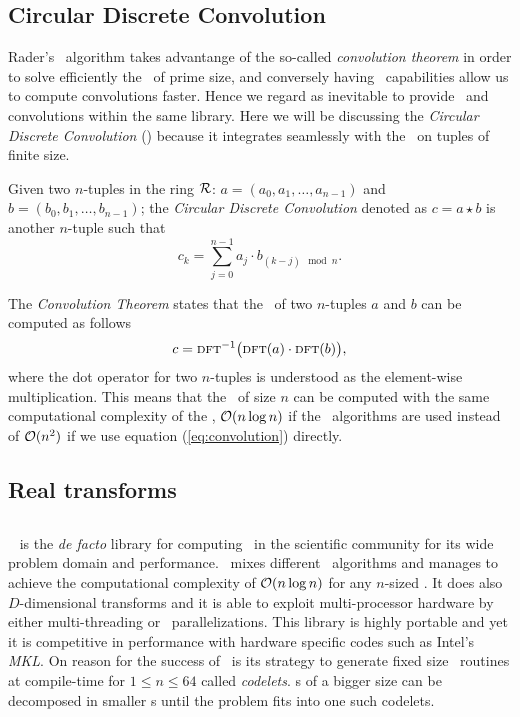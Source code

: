 \subsection{Circular Discrete Convolution}
Rader's \fft\ algorithm takes advantange of the so-called
\emph{convolution theorem} in order to solve efficiently the \dft\ of prime size, 
and conversely having \fft\ capabilities allow
us to compute convolutions faster. Hence we regard as
inevitable to provide \dft\ and convolutions within the same library.
Here we will be discussing the \emph{Circular Discrete Convolution} (\cdc)
because it integrates seamlessly with the \dft\ on tuples of finite size.
\begin{definition}
    Given two $n$-tuples in the ring $\mathcal{R}$: 
    $a = (a_0,a_1,\ldots,a_{n-1})$ and $b=(b_0,b_1,\ldots,b_{n-1})$;
    the \emph{Circular Discrete Convolution} denoted as 
    $c = a\star b$ is another
    $n$-tuple such that
    \begin{equation} 
        c_k = \sum_{j=0}^{n-1} a_j \cdot b_{(k-j) \mod n}.
        \label{eq:convolution}
    \end{equation}
    \label{def:convolution}
\end{definition}
The \emph{Convolution Theorem} states that the \cdc\ of two $n$-tuples $a$ and
$b$ can be computed as follows
\begin{equation}
    c = \textsc{dft}^{-1}\big( \textsc{dft}(a) \cdot \textsc{dft}(b)  \big),
    \label{eq:conv_theorem}
\end{equation}
where the dot operator for two $n$-tuples is understood as the element-wise
multiplication. This means that the \cdc\ of size $n$ can be computed with the
same computational complexity of the \dft, $\mathcal{O}(n\log n)$ if the \fft\
algorithms are used instead of $\mathcal{O}(n^2)$ if we use equation
(\ref{eq:convolution}) directly.

\subsection{Real transforms}

\subsection{\fftw}
\fftw\ \cite{FFTW05} is the \emph{de facto} library for computing \dft\ in the scientific
community for its wide problem domain and performance.
\fftw\ mixes different \fft\ algorithms and manages to achieve the computational
complexity of $\mathcal{O}(n \log n)$ for any $n$-sized \dft. It does also
$D$-dimensional transforms and it is able to exploit multi-processor hardware by
either multi-threading or \mpi\ parallelizations. This library is highly portable
and yet it is competitive in performance with hardware specific codes such as
Intel's \emph{MKL}. On reason for the success of \fftw\ is its strategy to
generate fixed size \fft\ routines at compile-time for $1\le n\le 64$ called \emph{codelets}.
\dft{}s of a bigger size can be decomposed in smaller \dft{}s until the problem
fits into one such codelets.

